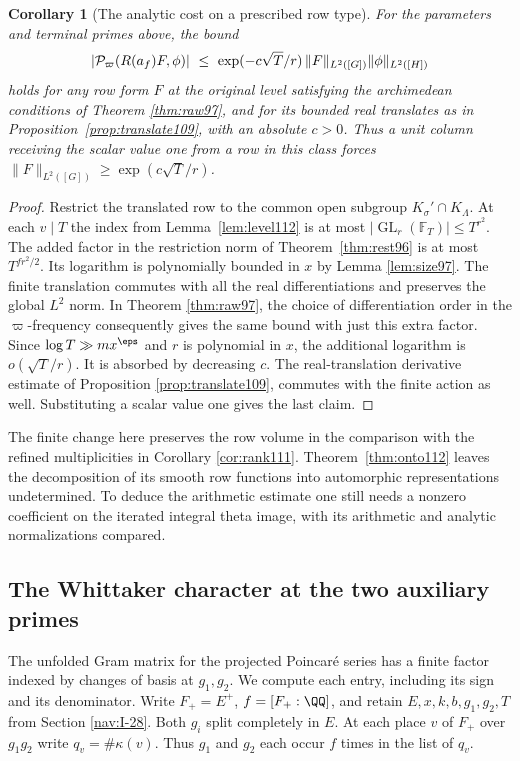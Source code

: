 \documentclass[a4paper,11pt]{article}
\newtheorem{corollary}[proposition]{Corollary}
\theoremstyle{definition}
\theoremstyle{remark}
\numberwithin{equation}{section}
\newcommand{\GL}{\operatorname{GL}}
\begin{document}
\begin{corollary}[The analytic cost on a prescribed row type]
\label{cor:cost112}
For the parameters and terminal primes above, the bound
\[
 |{\cal P}_{\varpi}(R(a_f)F,\phi)|
 \ \le\ \exp(-c\sqrt T/r)\,\|F\|_{L^2([G])}\|\phi\|_{L^2([H])}
\]
holds for any row form \(F\) at the original level satisfying
the archimedean conditions of Theorem \ref{thm:raw97}, and for its bounded real translates as
in Proposition~\ref{prop:translate109}, with an absolute \(c>0\).
Thus a unit column receiving the scalar value one from a row
in this class forces \(\|F\|_{L^2([G])}\ge\exp(c\sqrt T/r)\).
\end{corollary}
\begin{proof}
Restrict the translated row to the common open subgroup
\(K_\sigma'\cap K_\Lambda\). At each \(v\mid T\) the index
from Lemma~\ref{lem:level112} is at most
\(|\GL_r(\mathbb F_T)|\le T^{r^2}\).
The added factor in the restriction norm of Theorem~\ref{thm:rest96}
is at most \(T^{fr^2/2}\). Its logarithm is polynomially bounded
in \(x\) by Lemma \ref{lem:size97}. The finite translation commutes
with all the real differentiations and preserves the global
\(L^2\) norm. In Theorem \ref{thm:raw97}, the choice of
differentiation order in the \(\varpi\)-frequency consequently
gives the same bound with just this extra factor. Since
\(\log T\gg m x^\eps\) and \(r\) is polynomial in \(x\),
the additional logarithm is \(o(\sqrt T/r)\). It is absorbed
by decreasing \(c\). The real-translation derivative estimate
of Proposition \ref{prop:translate109}, commutes with the finite action
as well. Substituting a scalar value one gives the last claim.
\end{proof}

The finite change here preserves the row volume in the comparison
with the refined multiplicities in Corollary \ref{cor:rank111}.
Theorem~\ref{thm:onto112} leaves the decomposition of its smooth
row functions into automorphic representations undetermined.
To deduce the arithmetic estimate one
still needs a nonzero coefficient on the iterated integral theta
image, with its arithmetic and analytic normalizations compared.

\subsection{The Whittaker character at the two auxiliary primes}\label{nav:VI-13}
\label{sec:whit125}

The unfolded Gram matrix for the projected Poincar\'e series has a
finite factor indexed by changes of basis at \(g_1,g_2\). We compute
each entry, including its sign and its denominator. Write
\(F_+=E^+\), \(f=[F_+:\QQ]\), and retain \(E,x,k,b,g_1,g_2,T\) from
Section \ref{nav:I-28}.
Both \(g_i\) split completely in \(E\). At each place \(v\) of
\(F_+\) over \(g_1g_2\) write \(q_v=\#\kappa(v)\). Thus \(g_1\)
and \(g_2\) each occur \(f\) times in the list of \(q_v\).
\end{document}
